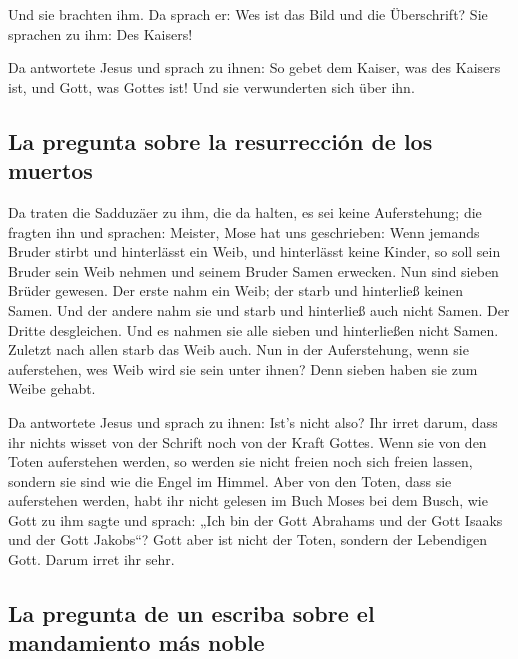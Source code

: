  Und sie brachten ihm. Da sprach er: Wes ist das Bild und
die Überschrift? Sie sprachen zu ihm: Des Kaisers!

 Da antwortete Jesus und sprach zu ihnen: So gebet dem
Kaiser, was des Kaisers ist, und Gott, was Gottes ist! Und sie
verwunderten sich über ihn.

\hypertarget{la-pregunta-sobre-la-resurrecciuxf3n-de-los-muertos}{%
\subsection{La pregunta sobre la resurrección de los
muertos}\label{la-pregunta-sobre-la-resurrecciuxf3n-de-los-muertos}}

 Da traten die Sadduzäer zu ihm, die da halten, es sei
keine Auferstehung; die fragten ihn und sprachen: 
Meister, Mose hat uns geschrieben: Wenn jemands Bruder stirbt und
hinterlässt ein Weib, und hinterlässt keine Kinder, so soll sein Bruder
sein Weib nehmen und seinem Bruder Samen erwecken.  Nun
sind sieben Brüder gewesen. Der erste nahm ein Weib; der starb und
hinterließ keinen Samen.  Und der andere nahm sie und
starb und hinterließ auch nicht Samen. Der Dritte desgleichen.
 Und es nahmen sie alle sieben und hinterließen nicht
Samen. Zuletzt nach allen starb das Weib auch.  Nun in
der Auferstehung, wenn sie auferstehen, wes Weib wird sie sein unter
ihnen? Denn sieben haben sie zum Weibe gehabt.

 Da antwortete Jesus und sprach zu ihnen: Ist's nicht
also? Ihr irret darum, dass ihr nichts wisset von der Schrift noch von
der Kraft Gottes.  Wenn sie von den Toten auferstehen
werden, so werden sie nicht freien noch sich freien lassen, sondern sie
sind wie die Engel im Himmel.  Aber von den Toten, dass
sie auferstehen werden, habt ihr nicht gelesen im Buch Moses bei dem
Busch, wie Gott zu ihm sagte und sprach: „Ich bin der Gott Abrahams und
der Gott Isaaks und der Gott Jakobs``?  Gott aber ist
nicht der Toten, sondern der Lebendigen Gott. Darum irret ihr sehr.

\hypertarget{la-pregunta-de-un-escriba-sobre-el-mandamiento-muxe1s-noble}{%
\subsection{La pregunta de un escriba sobre el mandamiento más
noble}\label{la-pregunta-de-un-escriba-sobre-el-mandamiento-muxe1s-noble}}

